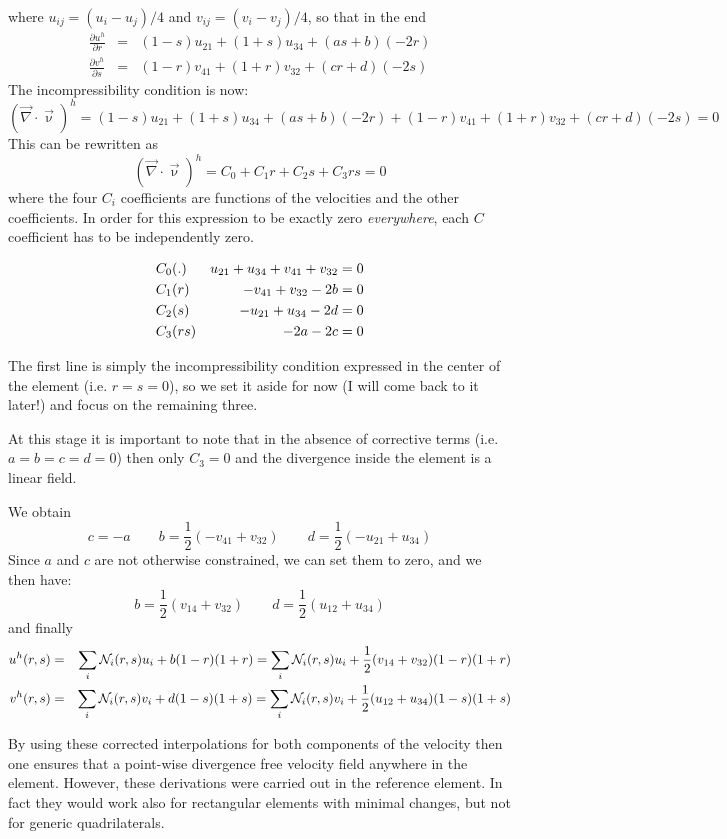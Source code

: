 where $u_{ij}=(u_i-u_j)/4$ and $v_{ij}=(v_i-v_j)/4$, so that in the end
\begin{eqnarray}
\frac{\partial u^h}{\partial r} &=& (1-s) u_{21} + (1+s) u_{34} + (a s + b)(-2r) \\
\frac{\partial v^h}{\partial s} &=& (1-r) v_{41} + (1+r) v_{32} + (c r + d)(-2s)
\end{eqnarray}
The incompressibility condition is now:
\[
(\vec\nabla\cdot\vec\upnu)^h =
(1-s) u_{21} + (1+s) u_{34} 
+ (a s + b) (-2r) +
(1-r) v_{41} + (1+r) v_{32}
+ (c r + d)(-2s)
=0
\]
This can be rewritten as
\[
(\vec\nabla\cdot\vec\upnu)^h =
C_0  + C_1 r + C_2 s + C_3 rs = 0
\]
where the four $C_i$ coefficients are functions of the velocities and the other coefficients.
In order for this expression to be exactly zero {\it everywhere}, each $C$ coefficient has
to be independently zero.

\begin{eqnarray}
C_0   &(.)  &  u_{21} + u_{34} + v_{41} + v_{32} =0\nonumber\\ 
C_1   &(r)  &  -v_{41} + v_{32} -2b =0\nonumber\\ 
C_2   &(s)  &  -u_{21} + u_{34} -2d =0 \nonumber\\ 
C_3   &(rs) &  -2a -2c =0\nonumber 
\end{eqnarray}

The first line is simply the incompressibility condition
expressed in the center of the element (i.e. $r=s=0$),
so we set it aside for now (I will come back to it later!)
and focus on the remaining three.

At this stage it is important to note that in the absence of corrective terms (i.e. $a=b=c=d=0$)
then only $C_3=0$ and the divergence inside the element is a linear field.

We obtain
\[
c=-a
\qquad
b=\frac{1}{2}(-v_{41} + v_{32})
\qquad
d=\frac{1}{2} (-u_{21} + u_{34})
\]
Since $a$ and $c$ are not otherwise constrained, we can set them to zero, and we then have:
\[
b=\frac{1}{2}(v_{14} + v_{32})
\quad\quad
d=\frac{1}{2} (u_{12} + u_{34})
\]
and finally
\begin{eqnarray}
u^h(r,s)
&=&\sum_i {\mathcal{N}}_i(r,s) u_i + b(1-r)(1+r) 
=\sum_i {\mathcal{N}}_i(r,s) u_i + \frac{1}{2}(v_{14} + v_{32})(1-r)(1+r) \nonumber\\
v^h(r,s)
&=&\sum_i {\mathcal{N}}_i(r,s) v_i + d(1-s)(1+s) 
=\sum_i {\mathcal{N}}_i(r,s) v_i + \frac{1}{2} (u_{12} + u_{34})(1-s)(1+s) \nonumber
\end{eqnarray}

By using these corrected interpolations for both components 
of the velocity then one ensures that a point-wise divergence free
velocity field anywhere in the element.
However, these derivations were carried out in the reference element. 
In fact they would work also for rectangular elements with minimal 
changes, but not for generic quadrilaterals.

